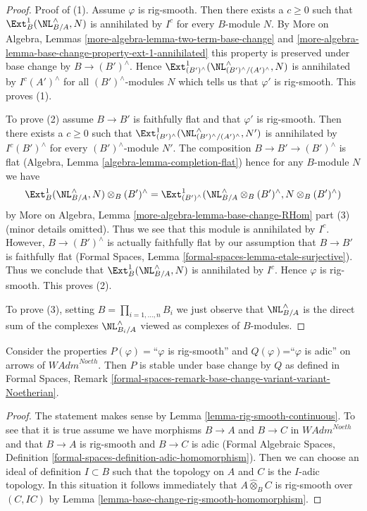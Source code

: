 \begin{proof}
\medskip\noindent
Proof of (1). Assume $\varphi$ is rig-smooth. Then there exists a $c \geq 0$
such that $\Ext^1_B(\NL_{B/A}^\wedge, N)$ is annihilated by $I^c$
for every $B$-module $N$. By
More on Algebra, Lemmas \ref{more-algebra-lemma-two-term-base-change} and
\ref{more-algebra-lemma-base-change-property-ext-1-annihilated}
this property is preserved under base change by $B \to (B')^\wedge$.
Hence $\Ext^1_{(B')^\wedge}(\NL_{(B')^\wedge/(A')^\wedge}^\wedge, N)$
is annihilated by $I^c(A')^\wedge$ for all $(B')^\wedge$-modules $N$
which tells us that $\varphi'$ is rig-smooth.
This proves (1).

\medskip\noindent
To prove (2) assume $B \to B'$ is faithfully flat and that $\varphi'$
is rig-smooth. Then there exists a $c \geq 0$ such that
$\Ext^1_{(B')^\wedge}(\NL_{(B')^\wedge/(A')^\wedge}^\wedge, N')$
is annihilated by $I^c(B')^\wedge$ for every $(B')^\wedge$-module $N'$.
The composition $B \to B' \to (B')^\wedge$ is flat
(Algebra, Lemma \ref{algebra-lemma-completion-flat})
hence for any $B$-module $N$ we have
$$
\Ext^1_B(\NL_{B/A}^\wedge, N) \otimes_B (B')^\wedge =
\Ext^1_{(B')^\wedge}(\NL_{B/A}^\wedge \otimes_B (B')^\wedge,
N \otimes_B (B')^\wedge)
$$
by More on Algebra, Lemma \ref{more-algebra-lemma-base-change-RHom} part (3)
(minor details omitted). Thus we see that this module is annihilated
by $I^c$. However, $B \to (B')^\wedge$ is actually faithfully flat
by our assumption that $B \to B'$ is faithfully flat (Formal Spaces, Lemma
\ref{formal-spaces-lemma-etale-surjective}). Thus we conclude that
$\Ext^1_B(\NL_{B/A}^\wedge, N)$ is annihilated by $I^c$.
Hence $\varphi$ is rig-smooth. This proves (2).

\medskip\noindent
To prove (3), setting $B = \prod_{i = 1, \ldots, n} B_i$
we just observe that $\NL_{B/A}^\wedge$ is the direct
sum of the complexes $\NL_{B_i/A}^\wedge$ viewed as complexes
of $B$-modules.
\end{proof}

\begin{lemma}
\label{lemma-base-change-rig-smooth-continuous}
Consider the properties $P(\varphi)=$``$\varphi$ is rig-smooth''
and $Q(\varphi)$=``$\varphi$ is adic'' on arrows of $\textit{WAdm}^{Noeth}$.
Then $P$ is stable under base change by $Q$ as defined in
Formal Spaces, Remark
\ref{formal-spaces-remark-base-change-variant-variant-Noetherian}.
\end{lemma}

\begin{proof}
The statement makes sense by Lemma \ref{lemma-rig-smooth-continuous}.
To see that it is true assume we have morphisms
$B \to A$ and $B \to C$ in $\textit{WAdm}^{Noeth}$
and that $B \to A$ is rig-smooth and $B \to C$ is adic
(Formal Algebraic Spaces, Definition
\ref{formal-spaces-definition-adic-homomorphism}).
Then we can choose an ideal of definition $I \subset B$
such that the topology on $A$ and $C$ is the $I$-adic topology.
In this situation it follows immediately that
$A \widehat{\otimes}_B C$ is rig-smooth over $(C, IC)$ by
Lemma \ref{lemma-base-change-rig-smooth-homomorphism}.
\end{proof}

